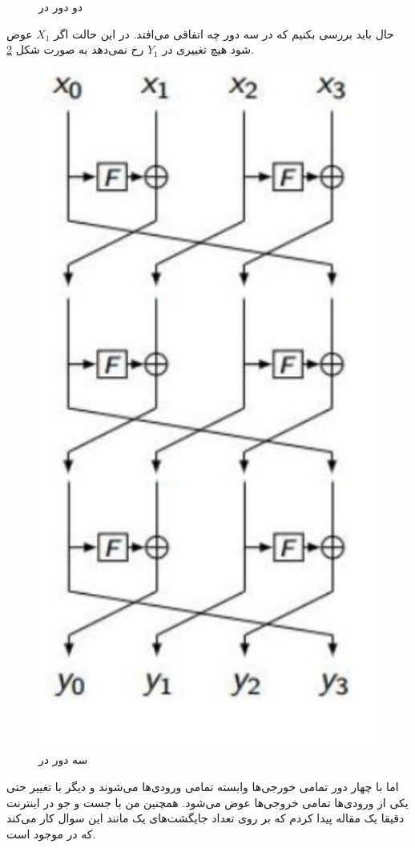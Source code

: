 \documentclass[]{article}
\begin{document}
\begin{enumerate}
\begin{figure}[H]
        \caption{دو دور در }
        \label{fig:generalized-feistel:2round}
    \end{figure}
    حال باید بررسی بکنیم که در سه دور چه اتفاقی می‌افتد. در این حالت اگر
    $X_1$
    عوض شود هیچ تغییری در
    $Y_1$
    رخ نمی‌دهد به صورت شکل
    \ref{fig:generalized-feistel:3round}.
    \begin{figure}[H]
        \centering
        \includegraphics[scale=0.3]{pics/3-3-rounds.jpg}
        \caption{سه دور در }
        \label{fig:generalized-feistel:3round}
    \end{figure}
    اما با چهار دور تمامی خورجی‌ها وابسته تمامی ورودی‌ها می‌شوند و دیگر با تغییر حتی یکی
    از ورودی‌ها تمامی خروجی‌ها عوض می‌شود. همچنین من با جست و جو در اینترنت دقیقا یک مقاله پیدا کردم
    که بر روی تعداد جایگشت‌های یک
    مانند این سوال کار می‌کند که در
    موجود است.
\end{enumerate}
\end{document}
